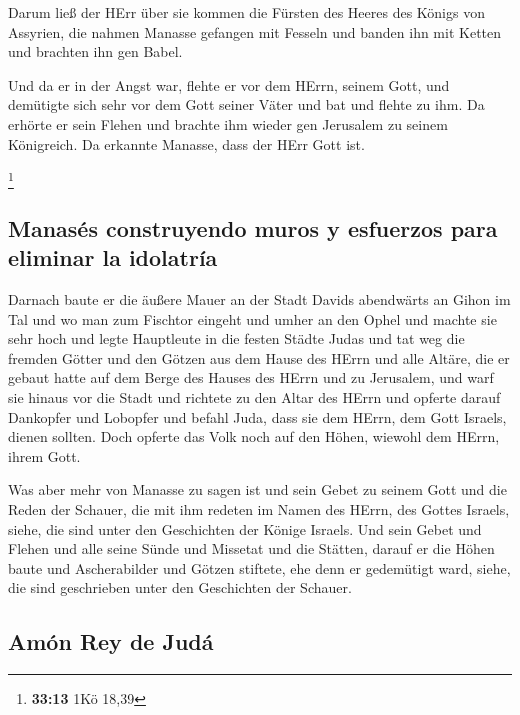  Darum ließ der HErr über sie kommen die Fürsten des
Heeres des Königs von Assyrien, die nahmen Manasse gefangen mit Fesseln
und banden ihn mit Ketten und brachten ihn gen Babel.

 Und da er in der Angst war, flehte er vor dem HErrn,
seinem Gott, und demütigte sich sehr vor dem Gott seiner Väter
 und bat und flehte zu ihm. Da erhörte er sein Flehen und
brachte ihm wieder gen Jerusalem zu seinem Königreich. Da erkannte
Manasse, dass der HErr Gott ist.

\footnote{\textbf{33:13} 1Kö 18,39}

\hypertarget{manasuxe9s-construyendo-muros-y-esfuerzos-para-eliminar-la-idolatruxeda}{%
\subsection{Manasés construyendo muros y esfuerzos para eliminar la
idolatría}\label{manasuxe9s-construyendo-muros-y-esfuerzos-para-eliminar-la-idolatruxeda}}

 Darnach baute er die äußere Mauer an der Stadt Davids
abendwärts an Gihon im Tal und wo man zum Fischtor eingeht und umher an
den Ophel und machte sie sehr hoch und legte Hauptleute in die festen
Städte Judas  und tat weg die fremden Götter und den
Götzen aus dem Hause des HErrn und alle Altäre, die er gebaut hatte auf
dem Berge des Hauses des HErrn und zu Jerusalem, und warf sie hinaus vor
die Stadt  und richtete zu den Altar des HErrn und
opferte darauf Dankopfer und Lobopfer und befahl Juda, dass sie dem
HErrn, dem Gott Israels, dienen sollten.  Doch opferte
das Volk noch auf den Höhen, wiewohl dem HErrn, ihrem Gott.

 Was aber mehr von Manasse zu sagen ist und sein Gebet zu
seinem Gott und die Reden der Schauer, die mit ihm redeten im Namen des
HErrn, des Gottes Israels, siehe, die sind unter den Geschichten der
Könige Israels.  Und sein Gebet und Flehen und alle seine
Sünde und Missetat und die Stätten, darauf er die Höhen baute und
Ascherabilder und Götzen stiftete, ehe denn er gedemütigt ward, siehe,
die sind geschrieben unter den Geschichten der Schauer.

\hypertarget{amuxf3n-rey-de-juduxe1}{%
\subsection{Amón Rey de Judá}\label{amuxf3n-rey-de-juduxe1}}

